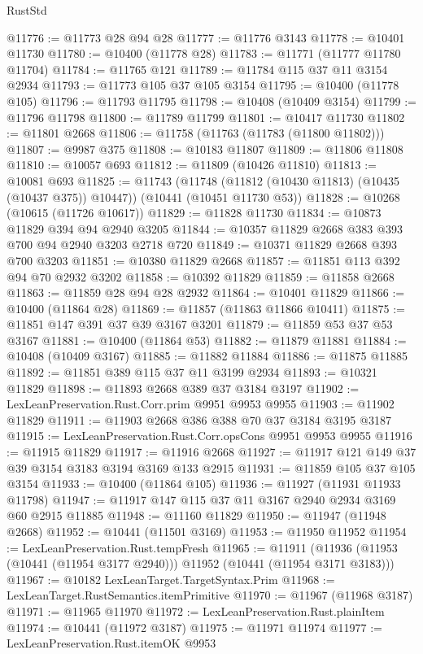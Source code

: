 \begin{lexlean}{RustStd}
\begin{coremodule}
@11776 := @11773 @28 @94 @28
@11777 := @11776 @3143
@11778 := @10401 @11730
@11780 := @10400 (@11778 @28)
@11783 := @11771 (@11777 @11780 @11704)
@11784 := @11765 @121
@11789 := @11784 @115 @37 @11 @3154 @2934
@11793 := @11773 @105 @37 @105 @3154
@11795 := @10400 (@11778 @105)
@11796 := @11793 @11795
@11798 := @10408 (@10409 @3154)
@11799 := @11796 @11798
@11800 := @11789 @11799
@11801 := @10417 @11730
@11802 := @11801 @2668
@11806 := @11758 (@11763 (@11783 (@11800 @11802)))
@11807 := @9987 @375
@11808 := @10183 @11807
@11809 := @11806 @11808
@11810 := @10057 @693
@11812 := @11809 (@10426 @11810)
@11813 := @10081 @693
@11825 := @11743
    (@11748 (@11812 (@10430 @11813) (@10435 (@10437 @375)) @10447))
    (@10441 (@10451 @11730 @53))
@11828 := @10268 (@10615 (@11726 @10617))
@11829 := @11828 @11730
@11834 := @10873 @11829 @394 @94 @2940 @3205
@11844 := @10357 @11829 @2668 @383 @393 @700 @94 @2940 @3203 @2718 @720
@11849 := @10371 @11829 @2668 @393 @700 @3203
@11851 := @10380 @11829 @2668
@11857 := @11851 @113 @392 @94 @70 @2932 @3202
@11858 := @10392 @11829
@11859 := @11858 @2668
@11863 := @11859 @28 @94 @28 @2932
@11864 := @10401 @11829
@11866 := @10400 (@11864 @28)
@11869 := @11857 (@11863 @11866 @10411)
@11875 := @11851 @147 @391 @37 @39 @3167 @3201
@11879 := @11859 @53 @37 @53 @3167
@11881 := @10400 (@11864 @53)
@11882 := @11879 @11881
@11884 := @10408 (@10409 @3167)
@11885 := @11882 @11884
@11886 := @11875 @11885
@11892 := @11851 @389 @115 @37 @11 @3199 @2934
@11893 := @10321 @11829
@11898 := @11893 @2668 @389 @37 @3184 @3197
@11902 := LexLeanPreservation.Rust.Corr.prim @9951 @9953 @9955
@11903 := @11902 @11829
@11911 := @11903 @2668 @386 @388 @70 @37 @3184 @3195 @3187
@11915 := LexLeanPreservation.Rust.Corr.opsCons @9951 @9953 @9955
@11916 := @11915 @11829
@11917 := @11916 @2668
@11927 := @11917 @121 @149 @37 @39 @3154 @3183 @3194 @3169 @133 @2915
@11931 := @11859 @105 @37 @105 @3154
@11933 := @10400 (@11864 @105)
@11936 := @11927 (@11931 @11933 @11798)
@11947 := @11917 @147 @115 @37 @11 @3167 @2940 @2934 @3169 @60 @2915 @11885
@11948 := @11160 @11829
@11950 := @11947 (@11948 @2668)
@11952 := @10441 (@11501 @3169)
@11953 := @11950 @11952
@11954 := LexLeanPreservation.Rust.tempFresh
@11965 := @11911
    (@11936 (@11953 (@10441 (@11954 @3177 @2940))) @11952 (@10441 (@11954 @3171 @3183)))
@11967 := @10182 LexLeanTarget.TargetSyntax.Prim
@11968 := LexLeanTarget.RustSemantics.itemPrimitive
@11970 := @11967 (@11968 @3187)
@11971 := @11965 @11970
@11972 := LexLeanPreservation.Rust.plainItem
@11974 := @10441 (@11972 @3187)
@11975 := @11971 @11974
@11977 := LexLeanPreservation.Rust.itemOK @9953

\end{coremodule}
\end{lexlean}
